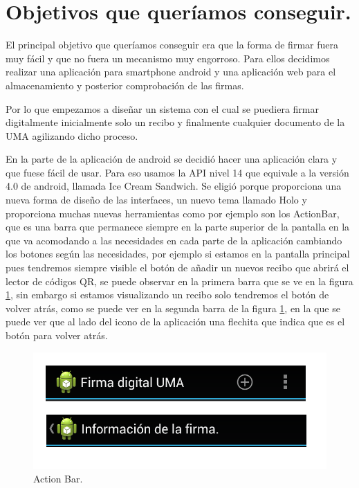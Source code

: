 \section{Objetivos que queríamos conseguir.} 
El principal objetivo que queríamos conseguir era que la forma de firmar fuera muy fácil y que no fuera un mecanismo muy engorroso. Para ellos decidimos realizar una aplicación para smartphone android y una aplicación web para el almacenamiento y posterior comprobación de las firmas.

Por lo que empezamos a diseñar un sistema con el cual se puediera firmar digitalmente inicialmente solo un recibo y finalmente cualquier documento de la UMA agilizando dicho proceso.


En la parte de la aplicación de android se decidió hacer una aplicación clara y que fuese fácil de usar. Para eso usamos la API nivel 14 que equivale a la versión 4.0 de android, llamada Ice Cream Sandwich. Se eligió porque proporciona una nueva forma de diseño de las interfaces, un nuevo tema  llamado Holo y proporciona muchas nuevas herramientas como por ejemplo son los ActionBar, que es una barra que permanece siempre en la parte superior de la pantalla en la que va acomodando a las necesidades en cada parte de la aplicación cambiando los botones según las necesidades, por ejemplo si estamos en la pantalla principal pues tendremos siempre visible el botón de añadir un nuevos recibo que abrirá el lector de códigos QR, se puede observar en la primera barra que se ve en la figura \ref{fig:actionBar}, sin embargo si estamos visualizando un recibo solo tendremos el botón de volver atrás, como se puede ver en la segunda barra de la figura \ref{fig:actionBar}, en la que se puede ver que al lado del icono de la aplicación una flechita que indica que es el botón para volver atrás.

\begin{figure}
  \centering
    \includegraphics[scale=0.3]{./Introduccion/imagenes/actionbar.png}
  \caption{Action Bar.}
  \label{fig:actionBar}
\end{figure}

